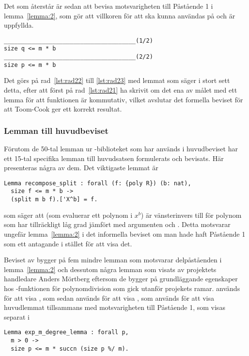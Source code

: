 Det som återstår är sedan att bevisa motsvarigheten till Påstående 1 i
lemma~\ref{lemma:2}, som gör att villkoren för att  ska
kunna användas på  och  är uppfyllda.
\begin{lstlisting}
______________________________________(1/2)
size q <= m * b
______________________________________(2/2)
size p <= m * b
\end{lstlisting}
Det görs på rad~\ref{lst:rad22} till \ref{lst:rad23} med lemmat
 som säger i stort sett detta, efter att först på
rad~\ref{lst:rad21} ha skrivit om det ena av målet med ett lemma för att
funktionen  är kommutativ, vilket avslutar det formella beviset för
att Toom-Cook ger ett korrekt resultat.

\subsubsection{Lemman till huvudbeviset}
Förutom de 50-tal lemman ur \ssr{}-biblioteket som har används i huvudbeviset har
ett 15-tal specifika lemman till huvudsatsen formulerats och bevisats. Här
presenteras några av dem. Det viktigaste lemmat är
\begin{lstlisting}
Lemma recompose_split : forall (f: {poly R}) (b: nat),
  size f <= m * b ->
  (split m b f).['X^b] = f.
\end{lstlisting}
som säger att  (som evaluerar ett polynom i $x^b$) är
vänsterinvers till  för polynom som har tillräckligt låg grad jämfört
med argumenten  och . Detta motsvarar ungefär lemma~\ref{lemma:2} i
det informella beviset om man hade haft Påstående 1 som ett antagande i stället
för att visa det.

Beviset av  bygger på fem mindre lemman som motsvarar
delpåståenden i lemma~\ref{lemma:2} och dessutom några lemman som visats av
projektets handledare Anders Mörtberg eftersom de bygger på grundläggande
egenskaper hos \ssr{}-funktionen  för polynomdivision som gick utanför
projekets ramar.
 används för att visa , som
sedan används för att visa , som används för att visa
huvudlemmat tillsammans med motsvarigheten till Påstående 1, som visas separat
i
\begin{lstlisting}
Lemma exp_m_degree_lemma : forall p,
  m > 0 ->
  size p <= m * succn (size p %/ m).
\end{lstlisting}

